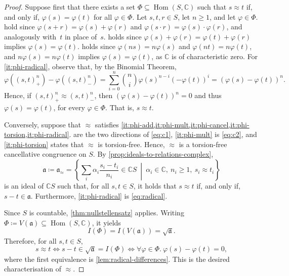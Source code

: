 \documentclass[11pt]{scrartcl}
\theoremstyle{definition}
\theoremstyle{plain}
\theoremstyle{remark}
\renewcommand\phi\varphi
\DeclareMathOperator\Hom{Hom}
\begin{document}
	\begin{proof}


		Suppose first that there exists a set $\Phi \subseteq \Hom(S, \mathbb{C})$
		such that $s \approx t$ if, and only if, $\phi(s) = \phi(t)$ for all $\phi \in \Phi$.
		Let $s, t, r \in S$, let $n \geq 1$, and let $\phi \in \Phi$.
		 hold since
		$\phi(s + r) = \phi(s) + \phi(r)$ and $\phi(s \cdot r) = \phi(s) \cdot \phi(r)$,
		and analogously with~$t$ in place of~$s$.
		 holds since
		$\phi(s) + \phi(r) = \phi(t) + \phi(r)$ implies $\phi(s) = \phi(t)$.
		 holds since $\phi(n s) = n\phi(s)$ and $\phi(n t) = n\phi(t)$,
		and $n\phi(s) = n\phi(t)$ implies $\phi(s) = \phi(t)$,
		as $\mathbb{C}$ is of characteristic zero.
		For \cref{it:phi-radical}, observe that, by the Binomial Theorem,
		\[
			\phi\left((s, t)^n_+\right) - \phi\left((s,t)^n_-\right)
			= \sum_{i=0}^n \binom{n}{i} \phi(s)^{n-i} \left(-\phi(t)\right)^i
			= \left(\phi(s) - \phi(t)\right)^n.
		\]
		Hence, if $(s, t)^n_+ \approx (s,t)^n_-$,
		then $\left(\phi(s) - \phi(t)\right)^n = 0$ and thus $\phi(s) = \phi(t)$,
		for every $\phi \in \Phi$.
		That is, $s \approx t$.

		Conversely, suppose that $\approx$ satisfies \cref{it:phi-add,it:phi-mult,it:phi-cancel,it:phi-torsion,it:phi-radical}.
		 are the two directions of \eqref{eq:c1},
		\cref{it:phi-mult} is \eqref{eq:c2},
		and \cref{it:phi-torsion} states that $\approx$ is torsion-free.
		Hence, $\approx$ is a torsion-free cancellative congruence on $S$.
		By \cref{prop:ideals-to-relations-complex},
		\[
			\mathfrak{a} \coloneqq \mathfrak{a}_{\approx}
			= \left\{ \sum_i \alpha_i \frac{s_i - t_i}{n_i} \in \mathbb{C}S
			\ \middle|\ \alpha_i \in \mathbb{C},\ n_i \geq 1,\ s_i \approx t_i \right\}
		\]
		is an ideal of $\mathbb{C}S$ such that, for all $s, t \in S$,
		it holds that $s \approx t$ if, and only if, $s - t \in \mathfrak{a}$.
		Furthermore, \cref{it:phi-radical} is \eqref{eq:radical}.

		Since $S$ is countable, \cref{thm:nullstellensatz} applies.
		Writing $\Phi \coloneqq V(\mathfrak{a}) \subseteq \Hom(S, \mathbb{C})$, it yields
		\[
			I(\Phi) = I(V(\mathfrak{a})) = \sqrt{\mathfrak{a}}.
		\]
		Therefore, for all $s, t \in S$,
		\[
			s \approx t
			\iff s - t \in \sqrt{\mathfrak{a}} = I(\Phi)
			\iff \forall \phi \in \Phi.\ \phi(s) - \phi(t) = 0,
		\]
		where the first equivalence is \cref{lem:radical-differences}.
		This is the desired characterisation of $\approx$.
	\end{proof}
\end{document}
